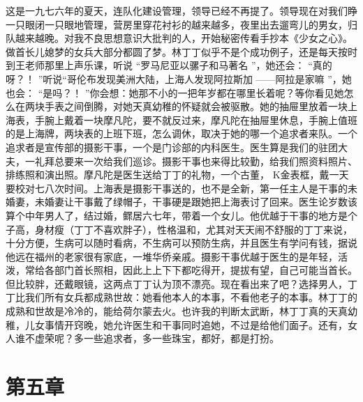 \documentclass[12pt,twoside,openany]{book}
\begin{document}
这是一九七六年的夏天，连队化建设管理，领导已经不再提了。领导现在对我们睁一只眼闭一只眼地管理，营房里穿花衬衫的越来越多，夜里出去遛弯儿的男女，归队越来越晚。对我不良思想意识大批判的人，开始秘密传看手抄本《少女之心》。做首长儿媳梦的女兵大部分都圆了梦。林丁丁似乎不是个成功例子，还是每天按时到王老师那里上声乐课，听说 “罗马尼亚以骡子和马著名 ”，她还会： “真的呀？！ ”听说“哥伦布发现美洲大陆，上海人发现阿拉斯加 ——阿拉是家嘛 ”，她也会： “是吗？！ ”你会想：她那不小的一把年岁都在哪里长着呢？等你看见她怎么在两块手表之间倒腾，对她天真幼稚的怀疑就会被驱散。她的抽屉里放着一块上海表，手腕上戴着一块摩凡陀，要不就反过来，摩凡陀在抽屉里休息，手腕上值班的是上海牌，两块表的上班下班，怎么调休，取决于她的哪一个追求者来队。一个追求者是宣传部的摄影干事，一个是门诊部的内科医生。医生算是我们的驻团大夫，一礼拜总要来一次给我们巡诊。摄影干事也来得比较勤，给我们照资料照片、排练照和演出照。摩凡陀是医生送给丁丁的礼物，一个古董， K金表框，戴一天要校对七八次时间。上海表是摄影干事送的，也不是全新，第一任主人是干事的未婚妻，未婚妻让干事戴了绿帽子，干事硬是跟她把上海表讨了回来。医生论岁数该算个中年男人了，结过婚，鳏居六七年，带着一个女儿。他优越于干事的地方是个子高，身材瘦（丁丁不喜欢胖子），性格温和，尤其对天天闹不舒服的丁丁来说，十分方便，生病可以随时看病，不生病可以预防生病，并且医生有学问有钱，据说他远在福州的老家很有家底，一堆华侨亲戚。摄影干事优越于医生的是年轻，活泼，常给各部门首长照相，因此上上下下都吃得开，提拔有望，自己可能当首长。但比较胖，还戴眼镜，这两点丁丁认为顶不漂亮。现在看出来了吧？选择男人，丁丁比我们所有女兵都成熟世故：她看他本人的本事，不看他老子的本事。林丁丁的成熟和世故是冷冷的，能给荷尔蒙去火。也许我的判断太武断，林丁丁真的天真幼稚，儿女事情开窍晚，她允许医生和干事同时追她，不过是给他们面子。还有，女人谁不虚荣呢？多一些追求者，多一些珠宝，都好，都是打扮。

\chapter{第五章}
\end{document}
